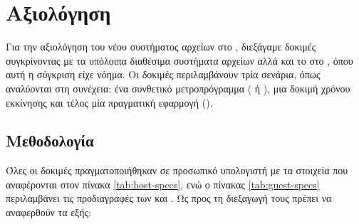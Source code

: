 \chapter{Αξιολόγηση}

Για την αξιολόγηση του νέου συστήματος αρχείων στο \osv{}, διεξάγαμε δοκιμές
συγκρίνοντας με τα υπόλοιπα διαθέσιμα συστήματα αρχείων αλλά και το
\viofs{} στο \linux{}, όπου αυτή η σύγκριση είχε νόημα. Οι δοκιμές περιλαμβάνουν
τρία σενάρια, όπως αναλύονται στη συνέχεια: ένα συνθετικό μετροπρόγραμμα
( ή ), μια δοκιμή χρόνου εκκίνησης
και τέλος μία πραγματική εφαρμογή ().

\section{Μεθοδολογία}
Όλες οι δοκιμές πραγματοποιήθηκαν σε προσωπικό υπολογιστή με τα στοιχεία που
αναφέρονται στον πίνακα \ref{tab:host-specs}, ενώ ο πίνακας
\ref{tab:guest-specs} περιλαμβάνει τις προδιαγραφές των \osv{} και \linux{}
. Ως προς τη διεξαγωγή τους πρέπει να αναφερθούν τα εξής:
